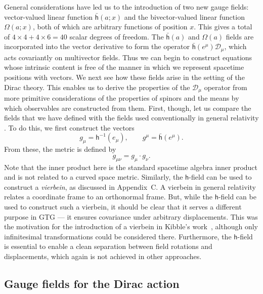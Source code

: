 \documentclass[a4paper]{article}
\numberwithin{equation}{section}
\newcommand{\dt}{\! \cdot \!}
\newcommand{\eqv}{=}
\newcommand{\Om}{\Omega}
\newcommand{\cld}{{\mathcal{D}}}
\newcommand{\lih}{\mathsf{h}}
\newcommand{\lbh}{\bar{\mathsf{h}}}
\newcommand{\ho}{\lbh}
\newcommand{\hu}{\lih}
\begin{document}
General considerations have led us to the introduction of two new
gauge fields: vector-valued linear function $\ho(a;x)$ and the
bivector-valued linear function $\Om(a;x)$, both of which are
arbitrary functions of position $x$.  This gives a total of $4\times
4+4\times 6=40$ scalar degrees of freedom.  The $\ho(a)$ and $\Om(a)$
fields are incorporated into the vector derivative to form the
operator $\ho(e^\mu)\cld_\mu$, which acts covariantly on multivector
fields.  Thus we can begin to construct equations whose intrinsic
content is free of the manner in which we represent spacetime
positions with vectors.  We next see how these fields arise in the
setting of the Dirac theory.  This enables us to derive the properties
of the $\cld_\mu$ operator from more primitive considerations of the
properties of spinors and the means by which observables are
constructed from them.  First, though, let us compare the fields that
we have defined with the fields used conventionally in general
relativity .  To do this, we first construct the vectors
%
\begin{equation}
g_\mu \eqv \hu^{-1}(e_\mu), \qquad
g^\mu \eqv \ho(e^\mu).
\end{equation}
%
From these, the metric is defined by
%
\begin{equation}
g_{\mu \nu} \eqv g_\mu \dt g_\nu.
\end{equation}
%
Note that the inner product here is the standard spacetime algebra
inner product and is not related to a curved space metric.  Similarly,
the $\lih$-field can be used to construct a \textit{vierbein}, as
discussed in Appendix~C.  A vierbein in general relativity relates a
coordinate frame to an orthonormal frame.  But, while the $\lih$-field
can be used to construct such a vierbein, it should be clear that it
serves a different purpose in GTG --- it ensures covariance under
arbitrary displacements.  This was the motivation for the introduction
of a vierbein in Kibble's work~\cite{kib61}, although only
infinitesimal transformations could be considered there.  Furthermore,
the $\lih$-field is essential to enable a clean separation between
field rotations and displacements, which again is not achieved in
other approaches.



\subsection{Gauge fields for the Dirac action}
\label{G-dirac}
\end{document}
